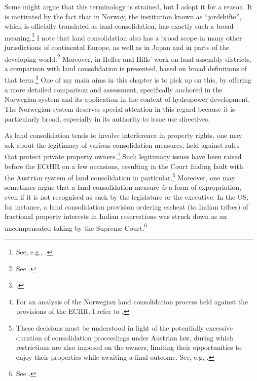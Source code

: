 Some might argue that this terminology is strained, but I adopt it for a reason. It is motivated by the fact that in Norway, the institution known as ``jordskifte'', which is officially translated as land consolidation, has exactly such a broad meaning.\footnote{See, e.g., \cite{reiten09,rognes03}.} I note that land consolidation also has a broad scope in many other jurisdictions of continental Europe, as well as in Japan and in parts of the developing world.\footnote{See \cite{sky07,vitikainen04}.} Moreover, in Heller and Hills' work on land assembly districts, a comparison with land consolidation is presented, based on broad definitions of that term.\footcite{heller08} One of my main aims in this chapter is to pick up on this, by offering a more detailed comparison and assessment, specifically anchored in the Norwegian system and its application in the context of hydropower development. The Norwegian system deserves special attention in this regard because it is particularly broad, especially in its authority to issue use directives.

As land consolidation tends to involve interference in property rights, one may ask about the legitimacy of various consolidation measures, held against rules that protect private property owners.\footnote{For an analysis of the Norwegian land consolidation process held against the provisions of the ECHR, I refer to \cite{utgard09}.} Such legitimacy issues have  been raised before the ECtHR on a few occasions, resulting in the Court finding fault with the Austrian system of land consolidation in particular.\footnote{These decisions must be understood in light of the potentially excessive duration of consolidation proceedings under Austrian law, during which restrictions are also imposed on the owners, limiting their opportunities to enjoy their properties while awaiting a final outcome. See, e.g, \cite{erkner87,poiss87}.} Moreover, one may sometimes argue that a land consolidation measure {\it is} a form of expropriation, even if it is not recognised as such by the legislature or the executive. In the US, for instance, a land consolidation provision ordering escheat (to Indian tribes) of fractional property interests in Indian reservations was struck down as an uncompensated taking by the Supreme Court.\footnote{See \cite{hodel87}.}


